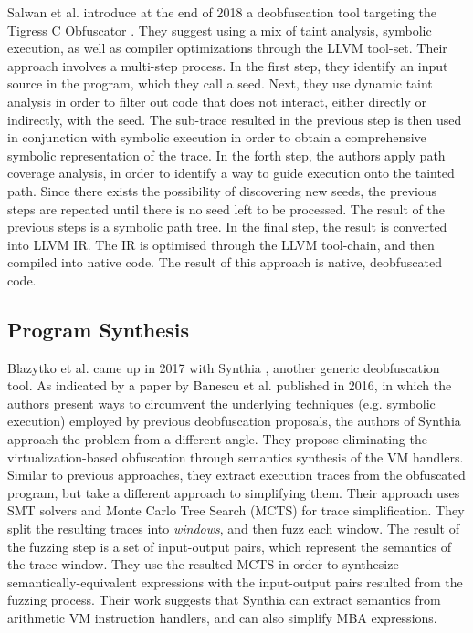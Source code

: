 Salwan et al. introduce at the end of 2018 a deobfuscation tool targeting the Tigress C Obfuscator \cite{symbolic_deobf_2018} \cite{tigress}. They suggest using a mix of taint analysis, symbolic execution, as well as compiler optimizations through the LLVM \cite{llvm} tool-set. Their approach involves a multi-step process. In the first step, they identify an input source in the program, which they call a seed. Next, they use dynamic taint analysis in order to filter out code that does not interact, either directly or indirectly, with the seed. The sub-trace resulted in the previous step is then used in conjunction with symbolic execution in order to obtain a comprehensive symbolic representation of the trace. In the forth step, the authors apply path coverage analysis, in order to identify a way to guide execution onto the tainted path. Since there exists the possibility of discovering new seeds, the previous steps are repeated until there is no seed left to be processed. The result of the previous steps is a symbolic path tree. In the final step, the result is converted into LLVM \gls{IR}. The \gls{IR} is optimised through the LLVM tool-chain, and then compiled into native code. The result of this approach is native, deobfuscated code.

\subsection{Program Synthesis}

Blazytko et al. came up in 2017 with Synthia \cite{blazytko2017}, another generic deobfuscation tool. As indicated by a paper by Banescu et al. \cite{banescu2016} published in 2016, in which the authors present ways to circumvent the underlying techniques (e.g. symbolic execution) employed by previous deobfuscation proposals, the authors of Synthia approach the problem from a different angle. They propose eliminating the virtualization-based obfuscation through semantics synthesis of the \gls{VM} handlers. Similar to previous approaches, they extract execution traces from the obfuscated program, but take a different approach to simplifying them. Their approach uses \gls{SMT} solvers and Monte Carlo Tree Search (MCTS) for trace simplification. They split the resulting traces into \emph{windows}, and then fuzz each window. The result of the fuzzing step is a set of input-output pairs, which represent the semantics of the trace window. They use the resulted MCTS in order to synthesize semantically-equivalent expressions with the input-output pairs resulted from the fuzzing process. Their work suggests that Synthia can extract semantics from arithmetic \gls{VM} instruction handlers, and can also simplify \gls{MBA} expressions.

